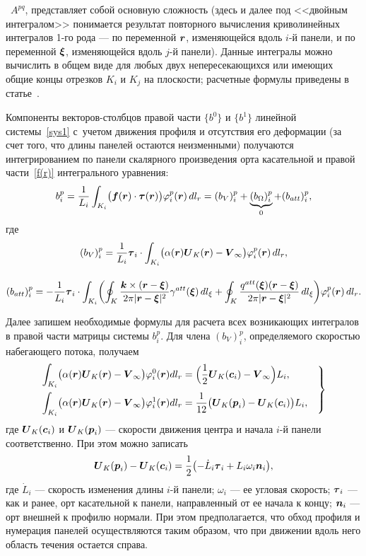 \documentclass[12pt, a4paper]{article}
\renewcommand{\vec}[1]{\text{\mathversion{bold}${#1}$}}%
\begin{document}
~$A^{pq}$, представляет собой основную сложность (здесь и далее под <<двойным интегралом>> понимается результат повторного вычисления криволинейных интегралов 1-го рода --- по  переменной $\vec r$, изменяющейся вдоль $i$-й панели, и по переменной $\vec\xi$, изменяющейся вдоль $j$-й панели).
Данные интегралы можно вычислить в общем виде для любых двух непересекающихся или имеющих общие концы отрезков $K_i$ и $K_j$ на плоскости; расчетные формулы приведены в статье~\cite{PMM}.

Компоненты векторов-столбцов правой части $\{b^0\}$ и $\{b^1\}$ линейной системы~\eqref{sys1} с~учетом движения профиля и отсутствия его деформации (за счет того, что длины панелей остаются неизменными) получаются интегрированием по панели скалярного произведения орта касательной и правой части~\eqref{f(r)} интегрального уравнения:
\[
b_i^p = \frac{1}{L_i} \int_{K_i} \bigl( \vec f(\vec r) \cdot \vec\tau(\vec r) \bigr) \varphi_i^p(\vec r)\, dl_r = (b_V)_i^p + \underbrace{(b_\Omega)_i^p}_0 + (b_{att})_i^p,
\]
где
\begin{gather*}
(b_V)_i^p = \frac{1}{L_i} \vec\tau_i \cdot \int_{K_i} \bigl( \alpha(\vec r) \vec U_K(\vec r) - \vec V_\infty \bigr) \varphi_i^p(\vec r)\, dl_r,\\[4mm]
(b_{att})_i^p = -\frac{1}{L_i} \vec\tau_i \cdot \int_{K_i} \biggl( \oint_{K} \frac{\vec k \times (\vec r - \vec \xi)}{2\pi|\vec r - \vec \xi|^2}\gamma^{att}(\vec\xi)\,dl_\xi
+\oint_{K} \frac{q^{att}(\vec \xi) (\vec r - \vec \xi)}{2\pi|\vec r - \vec \xi|^2}\,dl_\xi  \biggr)\varphi_i^p(\vec r)\, dl_r.
\end{gather*}

Далее запишем необходимые формулы для расчета всех возникающих интегралов в правой части матрицы системы $b_i^p$. Для члена $(b_V)_i^p$, определяемого скоростью набегающего потока, получаем
\begin{equation}
\label{VintUrect}
\left.
\begin{array}{@{}l@{}}
\displaystyle \int_{K_i} \bigl(\alpha(\vec r) \vec U_K(\vec r) - \vec V_\infty \bigr) \varphi_i^0(\vec r) dl_r = \Bigl( \frac12 \vec U_K (\vec c_i) - \vec V_\infty \Bigr) L_i,\\[4mm]
\displaystyle \int_{K_i} \bigl(\alpha(\vec r) \vec U_K(\vec r) - \vec V_\infty \bigr) \varphi_i^1(\vec r) dl_r = \frac{1}{12}\bigl(\vec U_K(\vec p_i) - \vec U_K(\vec c_i)\bigr) L_i,
\end{array}
\quad
\right\}
\end{equation}
где $\vec U_K(\vec c_i)$ и $\vec U_K(\vec p_i)$ --- скорости движения центра и начала $i$-й панели соответственно. При этом можно записать
\[
\vec U_K(\vec p_i) - \vec U_K(\vec c_i) = \frac12 \bigl( -\dot L_i \vec\tau_i + L_i \omega_i \vec n_i \bigr),
\]
где $\dot L_i$ --- скорость изменения длины $i$-й панели; $\omega_i$ --- ее угловая скорость; $\vec\tau_i$ --- как и ранее, орт касательной к панели, направленный от ее начала к концу; $\vec n_i$ --- орт внешней к профилю нормали. При этом предполагается, что обход профиля и нумерация панелей осуществляются таким образом, что при движении вдоль него область течения остается справа.
\end{document}
